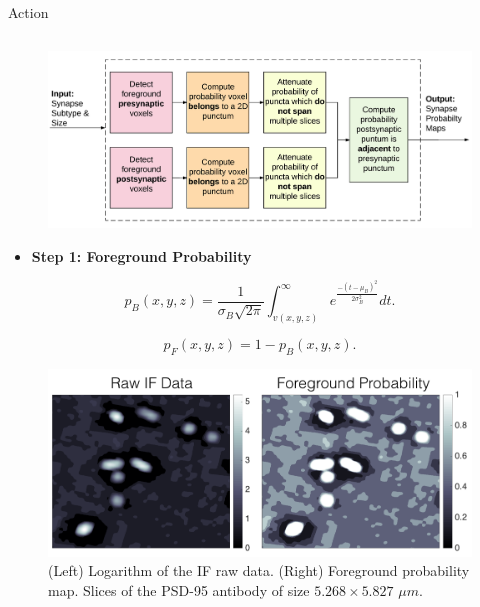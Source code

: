 \documentclass[final, table]{beamer}
\newlength{\onecolwid}
\newlength{\twocolwid}
\begin{document}
\begin{frame}[t]
\begin{columns}[t]
\begin{column}{\twocolwid}
\begin{block}{Action}
\begin{columns}[t]
\begin{column}{\onecolwid}
\begin{figure}
\centering
\includegraphics[width=1\textwidth]{figs/pipeline2}
\label{fig:pipeline}
\end{figure}

\begin{itemize} 
\item \textbf{Step 1: Foreground Probability} %
\end{itemize} 

\begin{equation} 
p_B(x,y,z) = \frac{1}{\sigma_B \sqrt{2 \pi}} \int^{\infty}_{v(x,y,z)} e^{\frac{-(t - \mu_B)^2}{2 \sigma_B^2}} d t.
\end{equation} 

\begin{equation}
p_F(x,y,z) = 1 - p_B(x,y,z).
\end{equation}

\begin{figure}
\centering
\includegraphics[width=1\textwidth]{figs/lograw_prob}
\caption{(Left) Logarithm of the IF raw data. (Right) Foreground probability map.  Slices of the PSD-95 antibody of size $5.268 \times 5.827$ $\mu m$.}
\label{fig:raw_prob} 
\end{figure}




\end{column}
\end{columns}
\end{block}
\end{column}
\end{columns}
\end{frame}
\end{document}
